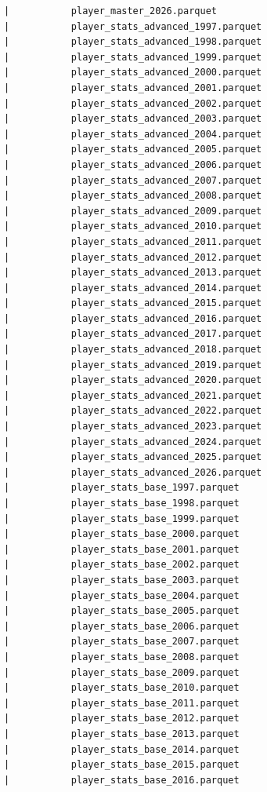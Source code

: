 \begin{lstlisting}
      |           player_master_2026.parquet
      |           player_stats_advanced_1997.parquet
      |           player_stats_advanced_1998.parquet
      |           player_stats_advanced_1999.parquet
      |           player_stats_advanced_2000.parquet
      |           player_stats_advanced_2001.parquet
      |           player_stats_advanced_2002.parquet
      |           player_stats_advanced_2003.parquet
      |           player_stats_advanced_2004.parquet
      |           player_stats_advanced_2005.parquet
      |           player_stats_advanced_2006.parquet
      |           player_stats_advanced_2007.parquet
      |           player_stats_advanced_2008.parquet
      |           player_stats_advanced_2009.parquet
      |           player_stats_advanced_2010.parquet
      |           player_stats_advanced_2011.parquet
      |           player_stats_advanced_2012.parquet
      |           player_stats_advanced_2013.parquet
      |           player_stats_advanced_2014.parquet
      |           player_stats_advanced_2015.parquet
      |           player_stats_advanced_2016.parquet
      |           player_stats_advanced_2017.parquet
      |           player_stats_advanced_2018.parquet
      |           player_stats_advanced_2019.parquet
      |           player_stats_advanced_2020.parquet
      |           player_stats_advanced_2021.parquet
      |           player_stats_advanced_2022.parquet
      |           player_stats_advanced_2023.parquet
      |           player_stats_advanced_2024.parquet
      |           player_stats_advanced_2025.parquet
      |           player_stats_advanced_2026.parquet
      |           player_stats_base_1997.parquet
      |           player_stats_base_1998.parquet
      |           player_stats_base_1999.parquet
      |           player_stats_base_2000.parquet
      |           player_stats_base_2001.parquet
      |           player_stats_base_2002.parquet
      |           player_stats_base_2003.parquet
      |           player_stats_base_2004.parquet
      |           player_stats_base_2005.parquet
      |           player_stats_base_2006.parquet
      |           player_stats_base_2007.parquet
      |           player_stats_base_2008.parquet
      |           player_stats_base_2009.parquet
      |           player_stats_base_2010.parquet
      |           player_stats_base_2011.parquet
      |           player_stats_base_2012.parquet
      |           player_stats_base_2013.parquet
      |           player_stats_base_2014.parquet
      |           player_stats_base_2015.parquet
      |           player_stats_base_2016.parquet

\end{lstlisting}
